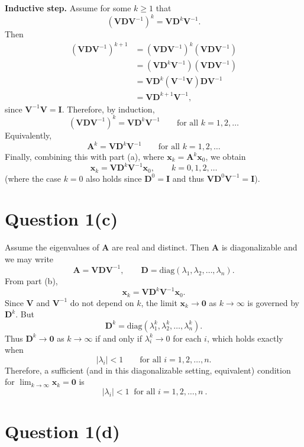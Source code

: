 \documentclass[11pt]{article}
\begin{document}
\textbf{Inductive step.} Assume for some $k\ge 1$ that
\[
(\mathbf{V}\mathbf{D}\mathbf{V}^{-1})^k = \mathbf{V}\mathbf{D}^k\mathbf{V}^{-1}.
\]
Then
\begin{align*}
(\mathbf{V}\mathbf{D}\mathbf{V}^{-1})^{k+1}
&= (\mathbf{V}\mathbf{D}\mathbf{V}^{-1})^k(\mathbf{V}\mathbf{D}\mathbf{V}^{-1}) \\
&= (\mathbf{V}\mathbf{D}^k\mathbf{V}^{-1})(\mathbf{V}\mathbf{D}\mathbf{V}^{-1}) \\
&= \mathbf{V}\mathbf{D}^k(\mathbf{V}^{-1}\mathbf{V})\mathbf{D}\mathbf{V}^{-1} \\
&= \mathbf{V}\mathbf{D}^{k+1}\mathbf{V}^{-1},
\end{align*}
since $\mathbf{V}^{-1}\mathbf{V}=\mathbf{I}$. Therefore, by induction,
\[
(\mathbf{V}\mathbf{D}\mathbf{V}^{-1})^k = \mathbf{V}\mathbf{D}^k\mathbf{V}^{-1}
\qquad \text{for all } k=1,2,\dots
\]
Equivalently,
\[
\mathbf{A}^k = \mathbf{V}\mathbf{D}^k\mathbf{V}^{-1}
\qquad \text{for all } k=1,2,\dots
\]
Finally, combining this with part (a), where $\mathbf{x}_k = \mathbf{A}^k\mathbf{x}_0$, we obtain
\[
\boxed{\ \mathbf{x}_k = \mathbf{V}\mathbf{D}^k\mathbf{V}^{-1}\mathbf{x}_0,\qquad k=0,1,2,\dots\ }
\]
(where the case $k=0$ also holds since $\mathbf{D}^0=\mathbf{I}$ and thus $\mathbf{V}\mathbf{D}^0\mathbf{V}^{-1}=\mathbf{I}$).

\section*{Question 1(c)}

Assume the eigenvalues of $\mathbf{A}$ are real and distinct. Then $\mathbf{A}$ is diagonalizable and we may write
\[
\mathbf{A}=\mathbf{V}\mathbf{D}\mathbf{V}^{-1},
\qquad
\mathbf{D}=\mathrm{diag}(\lambda_1,\lambda_2,\dots,\lambda_n).
\]
From part (b),
\[
\mathbf{x}_k = \mathbf{V}\mathbf{D}^k\mathbf{V}^{-1}\mathbf{x}_0.
\]
Since $\mathbf{V}$ and $\mathbf{V}^{-1}$ do not depend on $k$, the limit $\mathbf{x}_k\to \mathbf{0}$ as $k\to\infty$ is governed by $\mathbf{D}^k$. But
\[
\mathbf{D}^k=\mathrm{diag}(\lambda_1^k,\lambda_2^k,\dots,\lambda_n^k).
\]
Thus $\mathbf{D}^k\to \mathbf{0}$ as $k\to\infty$ if and only if $\lambda_i^k\to 0$ for each $i$, which holds exactly when
\[
|\lambda_i|<1 \qquad \text{for all } i=1,2,\dots,n.
\]
Therefore, a sufficient (and in this diagonalizable setting, equivalent) condition for $\lim_{k\to\infty}\mathbf{x}_k=\mathbf{0}$ is
\[
\boxed{\ |\lambda_i|<1\ \text{ for all } i=1,2,\dots,n\ }.
\]

\section*{Question 1(d)}
\end{document}
